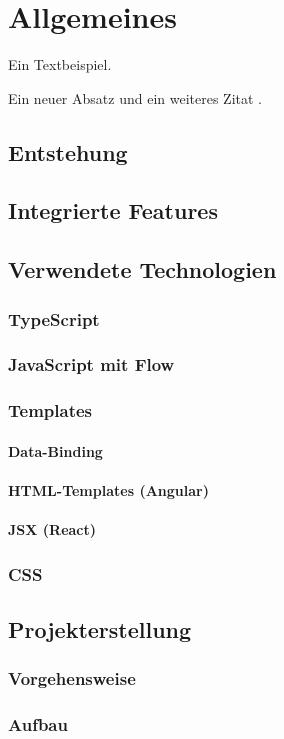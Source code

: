 \chapter{Allgemeines}
Ein Textbeispiel. \cite{schlosser}

Ein neuer Absatz und ein weiteres Zitat \cite{nadler}.

\section{Entstehung}

\section{Integrierte Features}

\section{Verwendete Technologien}

\subsection{TypeScript}

\subsection{JavaScript mit Flow}

\subsection{Templates}
\subsubsection{Data-Binding}
\subsubsection{HTML-Templates (Angular)}
\subsubsection{JSX (React)}

\subsection{CSS}

\section{Projekterstellung}
\subsection{Vorgehensweise}
\subsection{Aufbau}
